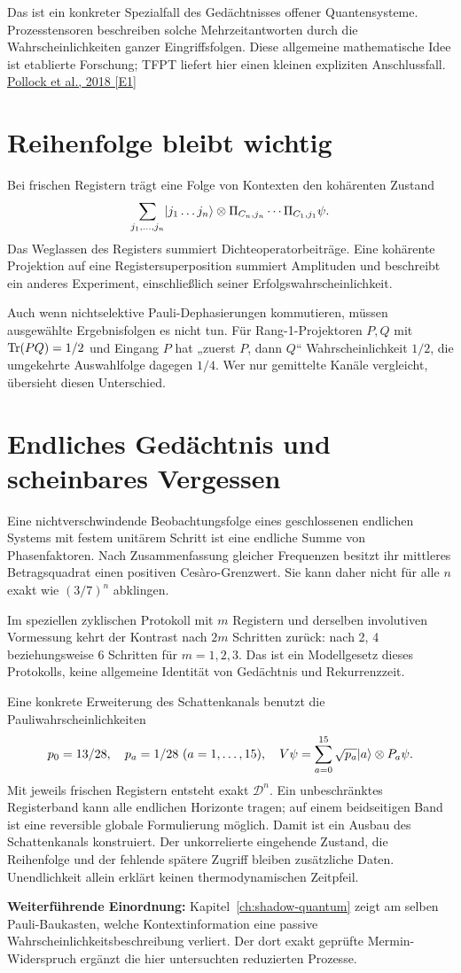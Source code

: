 Das ist ein konkreter Spezialfall des Gedächtnisses offener Quantensysteme. Prozesstensoren beschreiben solche Mehrzeitantworten durch die Wahrscheinlichkeiten ganzer Eingriffsfolgen. Diese allgemeine mathematische Idee ist etablierte Forschung; TFPT liefert hier einen kleinen expliziten Anschlussfall. \href{https://arxiv.org/abs/1512.00589}{Pollock et al., 2018 [E1]}

\section{Reihenfolge bleibt wichtig}
Bei frischen Registern trägt eine Folge von Kontexten den kohärenten Zustand
\begin{equation}
\sum_{j_1,\ldots,j_n}\lvert j_1\ldots j_n\rangle\otimes
\Pi_{C_n,j_n}\cdots\Pi_{C_1,j_1}\psi.
\end{equation}
Das Weglassen des Registers summiert Dichteoperatorbeiträge. Eine kohärente Projektion auf eine Registersuperposition summiert Amplituden und beschreibt ein anderes Experiment, einschließlich seiner Erfolgswahrscheinlichkeit.

Auch wenn nichtselektive Pauli-Dephasierungen kommutieren, müssen ausgewählte Ergebnisfolgen es nicht tun. Für Rang-1-Projektoren $P,Q$ mit $\operatorname{Tr}(PQ)=1/2$ und Eingang $P$ hat „zuerst $P$, dann $Q$“ Wahrscheinlichkeit $1/2$, die umgekehrte Auswahlfolge dagegen $1/4$. Wer nur gemittelte Kanäle vergleicht, übersieht diesen Unterschied.

\section{Endliches Gedächtnis und scheinbares Vergessen}
Eine nichtverschwindende Beobachtungsfolge eines geschlossenen endlichen Systems mit festem unitärem Schritt ist eine endliche Summe von Phasenfaktoren. Nach Zusammenfassung gleicher Frequenzen besitzt ihr mittleres Betragsquadrat einen positiven Cesàro-Grenzwert. Sie kann daher nicht für alle $n$ exakt wie $(3/7)^n$ abklingen.

Im speziellen zyklischen Protokoll mit $m$ Registern und derselben involutiven Vormessung kehrt der Kontrast nach $2m$ Schritten zurück: nach 2, 4 beziehungsweise 6 Schritten für $m=1,2,3$. Das ist ein Modellgesetz dieses Protokolls, keine allgemeine Identität von Gedächtnis und Rekurrenzzeit.

Eine konkrete Erweiterung des Schattenkanals benutzt die Pauliwahrscheinlichkeiten
\begin{equation}
p_0=13/28,\quad p_a=1/28\ (a=1,\ldots,15),\quad
V\psi=\sum_{a=0}^{15}\sqrt{p_a}\lvert a\rangle\otimes P_a\psi.
\end{equation}
Mit jeweils frischen Registern entsteht exakt $\mathcal D^n$. Ein unbeschränktes Registerband kann alle endlichen Horizonte tragen; auf einem beidseitigen Band ist eine reversible globale Formulierung möglich. Damit ist ein Ausbau des Schattenkanals konstruiert. Der unkorrelierte eingehende Zustand, die Reihenfolge und der fehlende spätere Zugriff bleiben zusätzliche Daten. Unendlichkeit allein erklärt keinen thermodynamischen Zeitpfeil. 

\par\noindent\textbf{Weiterführende Einordnung:} Kapitel~\ref{ch:shadow-quantum} zeigt am selben Pauli-Baukasten, welche Kontextinformation eine passive Wahrscheinlichkeitsbeschreibung verliert. Der dort exakt geprüfte Mermin-Widerspruch ergänzt die hier untersuchten reduzierten Prozesse.
